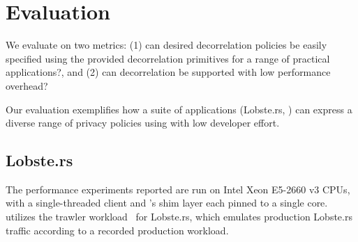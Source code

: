 \section{Evaluation}

We evaluate \sys{} on two metrics: (1) can desired decorrelation policies be easily specified using the
provided decorrelation primitives for a range of practical applications?, and (2) can decorrelation
be supported with low performance overhead?

Our evaluation exemplifies how a suite of applications (Lobste.rs, ) can express a diverse
range of privacy policies using \sys{} with low developer effort.

\subsection{Lobste.rs}
The performance experiments reported are run on Intel Xeon E5-2660 v3 CPUs, with a
single-threaded client and \sys{}'s shim layer each pinned to a single core. \sys{} utilizes the
trawler workload~\cite{trawler} for Lobste.rs, which emulates production Lobste.rs traffic according
to a recorded production workload. 
